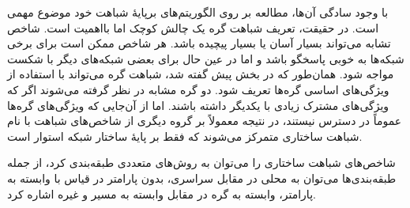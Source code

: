 با وجود سادگی آن‌ها، مطالعه بر روی الگوریتم‌های برپایهٔ شباهت خود موضوع مهمی است. در حقیقت، تعریف شباهت گره یک چالش کوچک اما بااهمیت است. شاخص تشابه می‌تواند بسیار آسان یا بسیار پیچیده باشد. هر شاخص ممکن است برای برخی شبکه‌ها به خوبی پاسخگو باشد و اما در عین حال برای بعضی شبکه‌های دیگر با شکست مواجه شود.
همان‌طور که در بخش پیش گفته شد، شباهت گره می‌تواند با استفاده از ویژگی‌های اساسی گره‌ها تعریف شود. دو گره مشابه در نظر گرفته می‌شوند اگر که ویژگی‌های مشترک زیادی با یکدیگر داشته باشند. اما از آن‌جایی که ویژگی‌های گره‌ها عموماً در دسترس نیستند، در نتیجه معمولاً بر گروه دیگری از شاخص‌های شباهت با نام شباهت ساختاری متمرکز می‌شوند که فقط بر پایهٔ ساختار شبکه استوار است.

شاخص‌های شباهت ساختاری را می‌توان به روش‌های متعددی طبقه‌بندی کرد، از جمله طبقه‌بندی‌ها می‌توان به محلی در مقابل سراسری، بدون پارامتر در قیاس با وابسته به پارامتر، وابسته به گره در مقابل وابسته به مسیر و غیره اشاره کرد.

